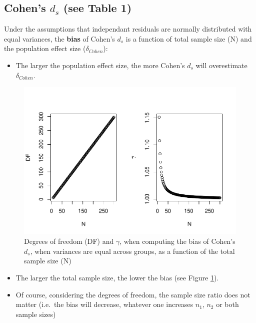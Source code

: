 \documentclass[
  man]{apa6}
\providecommand{\tightlist}{%
  \setlength{\itemsep}{0pt}\setlength{\parskip}{0pt}}
\begin{document}
\hypertarget{cohens-d_s-see-table-1}{%
\subsection{\texorpdfstring{Cohen's \(d_s\) (see Table 1)}{Cohen's d\_s (see Table 1)}}\label{cohens-d_s-see-table-1}}

Under the assumptions that independant residuals are normally distributed with equal variances, the \textbf{bias} of Cohen's \(d_s\) is a function of total sample size (N) and the population effect size (\(\delta_{Cohen}\)):

\begin{itemize}
\tightlist
\item
  The larger the population effect size, the more Cohen's \(d_s\) will overestimate \(\delta_{Cohen}\).
\end{itemize}

\begin{figure}
\centering
\includegraphics{Theoretical-Bias-of-all-estimators-as-a-function-of-population-parameters_files/figure-latex/biascohendNsize2-1.pdf}
\caption{\label{fig:biascohendNsize2}Degrees of freedom (DF) and \(\gamma\), when computing the bias of Cohen's \(d_s\), when variances are equal across groups, as a function of the total sample size (N)}
\end{figure}

\begin{itemize}
\item
  The larger the total sample size, the lower the bias (see Figure \ref{fig:biascohendNsize2}).
\item
  Of course, considering the degrees of freedom, the sample size ratio does not matter (i.e.~the bias will decrease, whatever one increases \(n_1\), \(n_2\) or both sample sizes)
\end{itemize}
\end{document}
